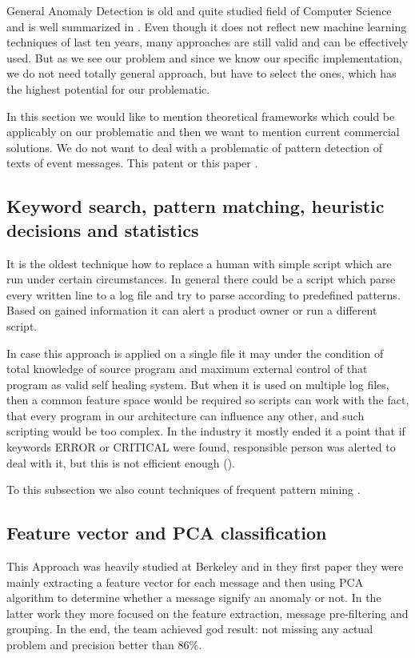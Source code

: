 General Anomaly Detection is old and quite studied field of Computer Science and is well summarized in \cite{chandola2009anomaly}. Even though it does not reflect new machine learning techniques of last ten years, many approaches are still valid and can be effectively used. But as we see our problem and since we know our specific implementation, we do not need totally general approach, but have to select the ones, which has the highest potential for our problematic.

In this section we would like to mention theoretical frameworks which could be applicably on our problematic and then we want to mention current commercial solutions. We do not want to deal with a problematic of pattern detection of texts of event messages. This patent \cite{bao2017hierarchical} or this paper \cite{vaarandi2008mining}.

\subsection{Keyword search, pattern matching, heuristic decisions and statistics} \label{app1}
It is the oldest technique how to replace a human with simple script which are run under certain circumstances. In general there could be a script which parse every written line to a log file and try to parse according to predefined patterns. Based on gained information it can alert a product owner or run a different script. 

In case this approach is applied on a single file it may under the condition of total knowledge of source program and maximum external control of that program as valid self healing system. But when it is used on multiple log files, then a common feature space would be required so scripts can work with the fact, that every program in our architecture can influence any other, and such scripting would be too complex. In the industry it mostly ended it a point that if keywords ERROR or CRITICAL were found, responsible person was alerted to deal with it, but this is not efficient enough (\cite{oliner2007supercomputers}).

To this subsection we also count techniques of frequent pattern mining \cite{han2007frequent}.

\subsection{Feature vector and PCA classification}
This Approach was heavily studied at Berkeley and in they first paper \cite{xu2008mining} they were mainly extracting a feature vector for each message and then using PCA algorithm to determine whether a message signify an anomaly or not. In the latter work \cite{xu2009online} they more focused on the feature extraction, message pre-filtering and grouping. In the end, the team achieved god result: not missing any actual problem and precision better than 86\%.

